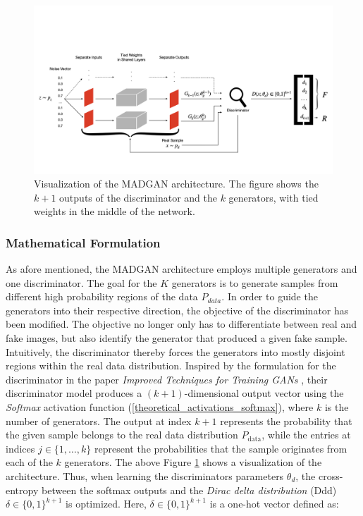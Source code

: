 \begin{figure}[htbp]
    \centering
    \vspace{-4em}
    \includegraphics[width=.9\textwidth]{abb/arch_madgan.png}
    \caption{Visualization of the MADGAN architecture. The figure shows the \(k+1\) outputs of the discriminator and the \(k\) generators, with tied weights in the middle of the network.}
    \label{fig:figure_madgan_arch}
\end{figure}


\subsubsection{Mathematical Formulation}
\label{theoretical_madgan_math}
As afore mentioned, the MADGAN architecture employs multiple generators and one discriminator. The goal for the \(K\) generators is to generate samples from different high probability regions of the data \(P_{data}\). In order to guide the generators into their respective direction, the objective of the discriminator has been modified. The objective no longer only has to differentiate between real and fake images, but also identify the generator that produced a given fake sample. Intuitively, the discriminator thereby forces the generators into mostly disjoint regions within the real data distribution. Inspired by the formulation for the discriminator in the paper \textit{Improved Techniques for Training GANs} \cite{salimans2016improvedtechniquestraininggans}, their discriminator model produces a \((k+1)\)-dimensional output vector using the \textit{Softmax} activation function (\ref{theoretical_activations_softmax}), where \(k\) is the number of generators. The output at index \(k+1\) represents the probability that the given sample belongs to the real data distribution \(P_{\text{data}}\), while the entries at indices \(j \in \{1, \ldots, k\}\) represent the probabilities that the sample originates from each of the \(k\) generators. The above Figure \ref{fig:figure_madgan_arch} shows a visualization of the architecture. Thus, when learning the discriminators parameters \(\theta_d\), the cross-entropy between the softmax outputs and the \textit{Dirac delta distribution} (Ddd) \(\delta \in \{0, 1\}^{k+1}\) is optimized. Here, \(\delta \in \{0,1\}^{k+1}\) is a one-hot vector defined as:

